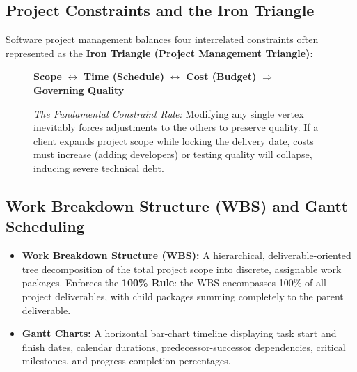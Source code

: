 \subsection{Project Constraints and the Iron Triangle}
Software project management balances four interrelated constraints often represented as the \textbf{Iron Triangle (Project Management Triangle)}:
\begin{figure}[htbp]
\centering
\begin{tcolorbox}[colback=codebg, colframe=primary, title=\textbf{The Iron Triangle of Project Constraints}]
\begin{center}
\textbf{Scope} $\longleftrightarrow$ \textbf{Time (Schedule)} $\longleftrightarrow$ \textbf{Cost (Budget)} $\Longrightarrow$ \textbf{Governing Quality}
\end{center}
\textit{The Fundamental Constraint Rule:} Modifying any single vertex inevitably forces adjustments to the others to preserve quality. If a client expands project scope while locking the delivery date, costs must increase (adding developers) or testing quality will collapse, inducing severe technical debt.
\end{tcolorbox}
\end{figure}

\subsection{Work Breakdown Structure (WBS) and Gantt Scheduling}
\begin{itemize}
    \item \textbf{Work Breakdown Structure (WBS):} A hierarchical, deliverable-oriented tree decomposition of the total project scope into discrete, assignable work packages. Enforces the \textbf{100\% Rule}: the WBS encompasses 100\% of all project deliverables, with child packages summing completely to the parent deliverable.
    \item \textbf{Gantt Charts:} A horizontal bar-chart timeline displaying task start and finish dates, calendar durations, predecessor-successor dependencies, critical milestones, and progress completion percentages.
\end{itemize}

